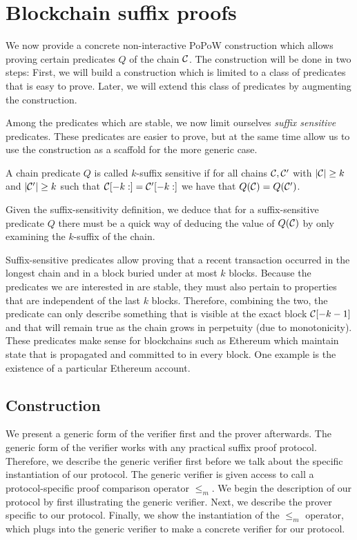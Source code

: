 \section{Blockchain suffix proofs}

We now provide a concrete non-interactive PoPoW construction which allows
proving certain predicates $Q$ of the chain $\mathcal{C}$. The construction will
be done in two steps: First, we will build a construction which is limited to
a class of predicates that is easy to prove. Later, we will extend this class
of predicates by augmenting the construction.

Among the predicates which are stable, we now limit ourselves \textit{suffix
sensitive} predicates. These predicates are easier to prove, but at the same
time allow us to use the construction as a scaffold for the more generic case.

\begin{definition}
A chain predicate $Q$ is called $k$-\textnormal{suffix sensitive} if for all
chains $\mathcal{C}, \mathcal{C}'$ with $|\mathcal{C}| \geq k$ and $|\mathcal{C}'| \geq k$ such that
$\mathcal{C}[-k:] = \mathcal{C}'[-k:]$ we have that $Q(\mathcal{C}) = Q(\mathcal{C}')$.
\end{definition}

Given the suffix-sensitivity definition, we deduce that for a suffix-sensitive
predicate $Q$ there must be a quick way of deducing the value of $Q(\mathcal{C})$ by
only examining the $k$-suffix of the chain.

Suffix-sensitive predicates allow proving that a recent transaction occurred in
the longest chain and in a block buried under at most $k$ blocks. Because the
predicates we are interested in are stable, they must also pertain to properties
that are independent of the last $k$ blocks. Therefore, combining the two, the
predicate can only describe something that is visible at the exact block
$\mathcal{C}[-k-1]$ and that will remain true as the chain grows in perpetuity (due
to monotonicity). These predicates make sense for blockchains such as Ethereum
which maintain state \cite{vitalik} that is propagated and committed to in every
block. One example is the existence of a particular Ethereum account.

\subsection{Construction}

We present a generic form of the verifier first and the prover afterwards. The
generic form of the verifier works with any practical suffix proof protocol.
Therefore, we describe the generic verifier first before we talk about the
specific instantiation of our protocol. The generic verifier is given access to
call a protocol-specific proof comparison operator $\leq_m$. We begin the
description of our protocol by first illustrating the generic verifier. Next, we
describe the prover specific to our protocol. Finally, we show the instantiation
of the $\leq_m$ operator, which plugs into the generic verifier to make a
concrete verifier for our protocol.

